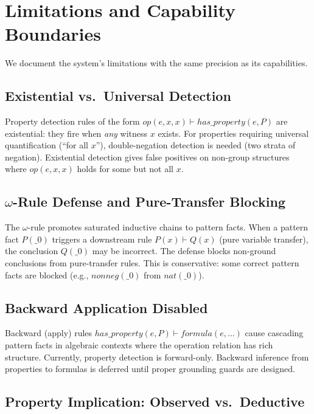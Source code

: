 \section{Limitations and Capability Boundaries}
\label{sec:limitations}

We document the system's limitations with the same precision as its capabilities.

\subsection{Existential vs.\ Universal Detection}

Property detection rules of the form $\mathit{op}(e, x, x) \vdash \mathit{has\_property}(e, P)$ are existential: they fire when \emph{any} witness $x$ exists. For properties requiring universal quantification (``for all $x$''), double-negation detection is needed (two strata of negation). Existential detection gives false positives on non-group structures where $\mathit{op}(e, x, x)$ holds for some but not all $x$.

\subsection{$\omega$-Rule Defense and Pure-Transfer Blocking}

The $\omega$-rule promotes saturated inductive chains to pattern facts. When a pattern fact $P(\_0)$ triggers a downstream rule $P(x) \vdash Q(x)$ (pure variable transfer), the conclusion $Q(\_0)$ may be incorrect. The defense blocks non-ground conclusions from pure-transfer rules. This is conservative: some correct pattern facts are blocked (e.g., $\mathit{nonneg}(\_0)$ from $\mathit{nat}(\_0)$).

\subsection{Backward Application Disabled}

Backward (apply) rules $\mathit{has\_property}(e, P) \vdash \mathit{formula}(e, \ldots)$ cause cascading pattern facts in algebraic contexts where the operation relation has rich structure. Currently, property detection is forward-only. Backward inference from properties to formulas is deferred until proper grounding guards are designed.

\subsection{Property Implication: Observed vs.\ Deductive}

